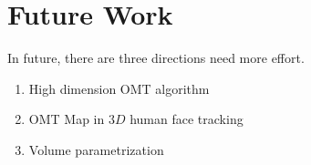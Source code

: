 \documentclass[runningheads]{llncs}
\begin{document}
\section{Future Work}
In future, there are three directions need more effort.

\begin{enumerate}

\item  High dimension OMT algorithm
\item  OMT Map in $3D$ human face tracking
\item  Volume parametrization
\end{enumerate}


\clearpage
%
%


\end{document}
